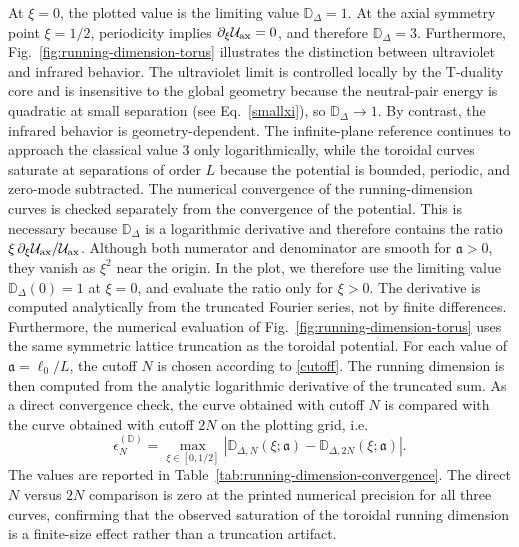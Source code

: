 \documentclass[openacc]{rsproca_new}%
\begin{document}
At $\xi=0$, the plotted value is the limiting value $\mathbb D_\Delta= 1$. At the axial symmetry point $\xi=1/2$, periodicity implies $\partial_\xi\mathcal U_{\rm ax}=0$, and therefore $\mathbb D_\Delta=3$. Furthermore, Fig.~\ref{fig:running-dimension-torus} illustrates the distinction between ultraviolet and infrared behavior. The ultraviolet limit is controlled locally by the T-duality core and is insensitive to the global geometry because the neutral-pair energy is quadratic at small separation (see Eq.~\ref{smallxi}), so $\mathbb D_\Delta\to 1$. By contrast, the infrared behavior is geometry-dependent. The infinite-plane reference continues to approach the classical value $3$ only logarithmically, while the toroidal curves saturate at separations of order $L$ because the potential is bounded, periodic, and zero-mode subtracted.  The numerical convergence of the running-dimension curves is checked separately from the convergence of the potential. This is necessary because $\mathbb D_\Delta$ is a logarithmic derivative and therefore contains the ratio $\xi\,\partial_\xi\mathcal U_{\rm ax}/\mathcal U_{\rm ax}$. Although both numerator and denominator are smooth for $\mathfrak a>0$, they vanish as $\xi^2$ near the origin. In the plot, we therefore use the limiting value $\mathbb D_\Delta(0)=1$ at $\xi=0$, and evaluate the ratio only for $\xi>0$. The derivative is computed analytically from the truncated Fourier series, not by finite differences. Furthermore, the numerical evaluation of Fig.~\ref{fig:running-dimension-torus} uses the same symmetric lattice truncation as the toroidal potential. For each value of $\mathfrak a=\ell_0/L$, the cutoff $N$ is chosen according to \eqref{cutoff}. The running dimension is then computed from the analytic logarithmic derivative of the truncated sum. As a direct convergence check, the curve obtained with cutoff $N$ is compared with the curve obtained with cutoff $2N$ on the plotting grid, i.e.
\begin{equation}
  \epsilon_N^{(\mathbb D)}=\max_{\xi\in[0,1/2]}\left|\mathbb D_{\Delta,N}(\xi;\mathfrak a) -\mathbb D_{\Delta,2N}(\xi;\mathfrak a)\right|.
\end{equation}
The values are reported in Table~\ref{tab:running-dimension-convergence}. The direct $N$ versus $2N$ comparison is zero at the printed numerical precision for all three curves, confirming that the observed saturation of the toroidal running dimension is a finite-size effect rather than a truncation artifact.
\end{document}

